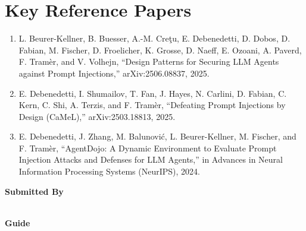 \documentclass[11pt]{article}
\begin{document}
\section*{Key Reference Papers}
\begin{enumerate}
  \item L. Beurer-Kellner, B. Buesser, A.-M. Cre\c{t}u, E. Debenedetti, D. Dobos, D. Fabian, M. Fischer, D. Froelicher, K. Grosse, D. Naeff, E. Ozoani, A. Paverd, F. Tram\`er, and V. Volhejn, ``Design Patterns for Securing LLM Agents against Prompt Injections,'' arXiv:2506.08837, 2025.
  \item E. Debenedetti, I. Shumailov, T. Fan, J. Hayes, N. Carlini, D. Fabian, C. Kern, C. Shi, A. Terzis, and F. Tram\`er, ``Defeating Prompt Injections by Design (CaMeL),'' arXiv:2503.18813, 2025.
  \item E. Debenedetti, J. Zhang, M. Balunovi\'c, L. Beurer-Kellner, M. Fischer, and F. Tram\`er, ``AgentDojo: A Dynamic Environment to Evaluate Prompt Injection Attacks and Defenses for LLM Agents,'' in Advances in Neural Information Processing Systems (NeurIPS), 2024.
\end{enumerate}
\vspace{0.8em}
\noindent\textbf{Submitted By}\\
\seminarName\\
\seminarRoll

\vspace{0.6em}
\noindent\textbf{Guide}\\
\seminarGuide
\end{document}
